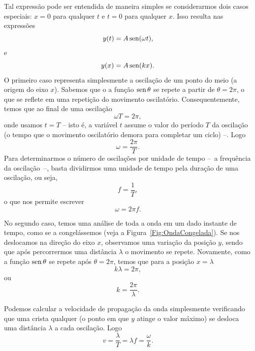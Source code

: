 Tal expressão pode ser entendida de maneira simples se considerarmos dois casos especiais: $x = 0$ para qualquer $t$ e $t = 0$ para qualquer $x$. Isso resulta nas expressões
\begin{equation}
	y(t) = A \operatorname{sen} (\omega t),
\end{equation}
%
e
\begin{equation}
	y(x) = A \operatorname{sen}(kx).
\end{equation}
%
O primeiro caso representa simplesmente a oscilação de um ponto do meio (a origem do eixo $x$). Sabemos que o a função $\operatorname{sen} \theta$ se repete a partir de $\theta = 2\pi$, o que se reflete em uma repetição do movimento oscilatório. Consequentemente, temos que ao final de uma oscilação
\begin{equation}
	\omega T = 2 \pi,
\end{equation}
%
onde usamos $t = T$ -- isto é, a variável $t$ assume o valor do período $T$ da oscilação (o tempo que o movimento oscilatório demora para completar um ciclo) --. Logo
\begin{equation}
	\omega = \frac{2 \pi}{T}.
\end{equation}
%
Para determinarmos o número de oscilações por unidade de tempo --~a frequência da oscilação~--, basta dividirmos uma unidade de tempo pela duração de uma oscilação, ou seja,
\begin{equation}
	f = \frac{1}{T},
\end{equation}
%
o que nos permite escrever
\begin{equation}
	\omega = 2 \pi f.
\end{equation}

No segundo caso, temos uma análise de toda a onda em um dado instante de tempo, como se a congelássemos (veja a Figura~\ref{Fig:OndaCongelada}). Se nos deslocamos na direção do eixo $x$, observamos uma variação da posição $y$, sendo que após percorrermos uma distância $\lambda$ o movimento se repete. Novamente, como a função $\operatorname{sen}\theta$ se repete após $\theta = 2\pi$, temos que para a posição $x = \lambda$
\begin{equation}
	k \lambda = 2\pi,
\end{equation}
%
ou
\begin{equation}
	k = \frac{2\pi}{\lambda}.
\end{equation}

Podemos calcular a velocidade de propagação da onda simplesmente verificando que uma crista qualquer (o ponto em que $y$ atinge o valor máximo) se desloca uma distância $\lambda$ a cada oscilação. Logo
\begin{equation}
	v = \frac{\lambda}{T} = \lambda f = \frac{\omega}{k}.
\end{equation}


